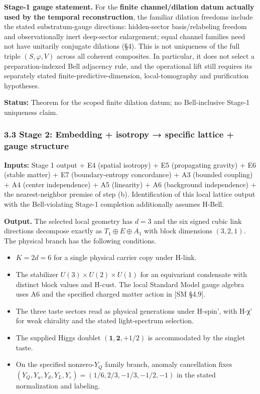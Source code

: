 \documentclass[
]{article}
\providecommand{\tightlist}{%
  \setlength{\itemsep}{0pt}\setlength{\parskip}{0pt}}
\begin{document}
\textbf{Stage-1 gauge statement.} For the \textbf{finite
channel/dilation datum actually used by the temporal reconstruction},
the familiar dilation freedoms include the stated substratum-gauge
directions: hidden-sector basis/relabeling freedom and observationally
inert deep-sector enlargement; equal channel families need not have
unitarily conjugate dilations (§4). This is not uniqueness of the full
triple \((S,\varphi,V)\) across all coherent composites. In particular,
it does not select a preparation-indexed Bell adjacency rule, and the
operational lift still requires its separately stated
finite-predictive-dimension, local-tomography and purification
hypotheses.

\textbf{Status:} Theorem for the scoped finite dilation datum; no
Bell-inclusive Stage-1 uniqueness claim.

\hypertarget{stage-2-embedding-isotropy-specific-lattice-gauge-structure}{%
\subsubsection{3.3 Stage 2: Embedding + isotropy → specific lattice +
gauge
structure}\label{stage-2-embedding-isotropy-specific-lattice-gauge-structure}}

\textbf{Inputs:} Stage 1 output + E4 (spatial isotropy) + E5
(propagating gravity) + E6 (stable matter) + E7 (boundary-entropy
concordance) + A3 (bounded coupling) + A4 (center independence) + A5
(linearity) + A6 (background independence) + the nearest-neighbor
premise of step (b). Identification of this local lattice output with
the Bell-violating Stage-1 completion additionally assumes H-Bell.

\textbf{Output.} The selected local geometry has \(d=3\) and the six
signed cubic link directions decompose exactly as
\(T_1\oplus E\oplus A_1\) with block dimensions \((3,2,1)\). The
physical branch has the following conditions.

\begin{itemize}
\tightlist
\item
  \(K=2d=6\) for a single physical carrier copy under H-link.
\item
  The stabilizer \(U(3)\times U(2)\times U(1)\) for an equivariant
  condensate with distinct block values and H-cust. The local Standard
  Model gauge algebra uses A6 and the specified charged matter action in
  {[}SM §4.9{]}.
\item
  The three taste sectors read as physical generations under H-spin',
  with H-χ' for weak chirality and the stated light-spectrum selection.
\item
  The supplied Higgs doublet \((\mathbf{1},\mathbf{2},+1/2)\) is
  accommodated by the singlet taste.
\item
  On the specified nonzero-\(Y_Q\) family branch, anomaly cancellation
  fixes \((Y_Q,Y_u,Y_d,Y_L,Y_e)=(1/6,2/3,-1/3,-1/2,-1)\) in the stated
  normalization and labeling.
\end{itemize}
\end{document}
